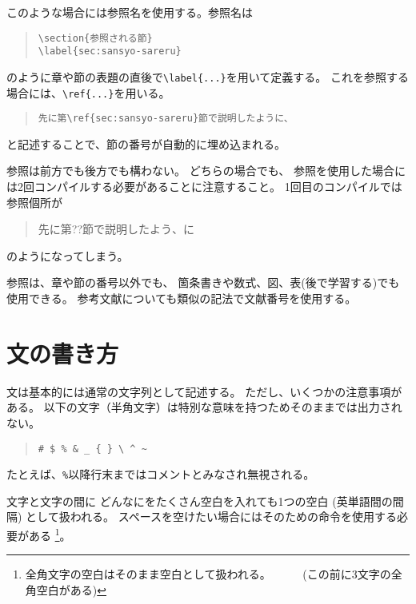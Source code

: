 \documentclass[fontsize=12pt, paper=a4]{jlreq}
\begin{document}
このような場合には参照名を使用する。参照名は
\begin{quote}
\begin{verbatim}
\section{参照される節}
\label{sec:sansyo-sareru}
\end{verbatim}
\end{quote}
のように章や節の表題の直後で\verb|\label{...}|を用いて定義する。
これを参照する場合には、\verb|\ref{...}|を用いる。
\begin{quote}
\begin{verbatim}
先に第\ref{sec:sansyo-sareru}節で説明したように、
\end{verbatim}
\end{quote}
と記述することで、節の番号が自動的に埋め込まれる。

参照は前方でも後方でも構わない。
どちらの場合でも、
参照を使用した場合には2回コンパイルする必要があることに注意すること。
1回目のコンパイルでは参照個所が
\begin{quote}
先に第??節で説明したよう、に
\end{quote}
のようになってしまう。

参照は、章や節の番号以外でも、
箇条書きや数式、図、表(後で学習する)でも使用できる。
参考文献についても類似の記法で文献番号を使用する。


\section{文の書き方}\label{writingSentences.tex}

文は基本的には通常の文字列として記述する。
ただし、いくつかの注意事項がある。
以下の文字（半角文字）は特別な意味を持つためそのままでは出力されない。

\begin{quote}
\begin{verbatim}
# $ % & _ { } \ ^ ~
\end{verbatim}
\end{quote}

たとえば、\verb|%|以降行末まではコメントとみなされ無視される。

文字と文字の間に          どんなにをたくさん空白を入れても1つの空白 
(英単語間の間隔) として扱われる。
スペースを空けたい場合にはそのための命令を使用する必要がある
\footnote{全角文字の空白はそのまま空白として扱われる。　　　
(この前に3文字の全角空白がある)}。
\end{document}
